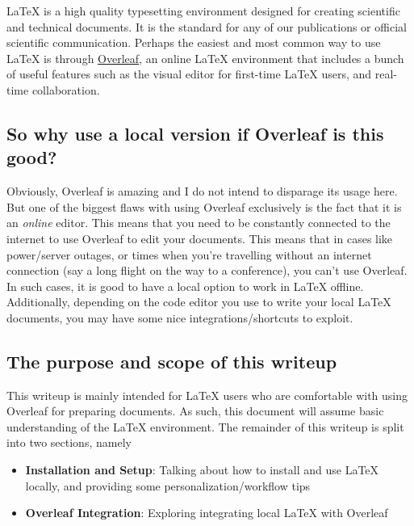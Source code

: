 \graphicspath{{Parts/1_Introductions/graphics/}}

\LaTeX{}{} is a high quality typesetting environment designed for creating scientific and technical documents. It is the standard for any of our publications or official scientific communication. Perhaps the easiest and most common way to use \LaTeX{}{} is through \hyperlink{https://www.overleaf.com}{Overleaf}, an online \LaTeX{} environment that includes a bunch of useful features such as the visual editor for first-time \LaTeX{} users, and real-time collaboration.

\subsection{So why use a local version if Overleaf is this good?}
Obviously, Overleaf is amazing and I do not intend to disparage its usage here. But one of the biggest flaws with using Overleaf exclusively is the fact that it is an \emph{online} editor. This means that you need to be constantly connected to the internet to use Overleaf to edit your documents. This means that in cases like power/server outages, or times when you're travelling without an internet connection (say a long flight on the way to a conference), you can't use Overleaf. In such cases, it is good to have a local option to work in \LaTeX{} offline. Additionally, depending on the code editor you use to write your local \LaTeX{} documents, you may have some nice integrations/shortcuts to exploit.

\subsection{The purpose and scope of this writeup}
This writeup is mainly intended for \LaTeX{} users who are comfortable with using Overleaf for preparing documents. As such, this document will assume basic understanding of the \LaTeX{} environment. The remainder of this writeup is split into two sections, namely
\begin{itemize}
    \item \textbf{Installation and Setup}: Talking about how to install and use \LaTeX{} locally, and providing some personalization/workflow tips
    \item \textbf{Overleaf Integration}: Exploring integrating local \LaTeX{} with Overleaf
\end{itemize}

